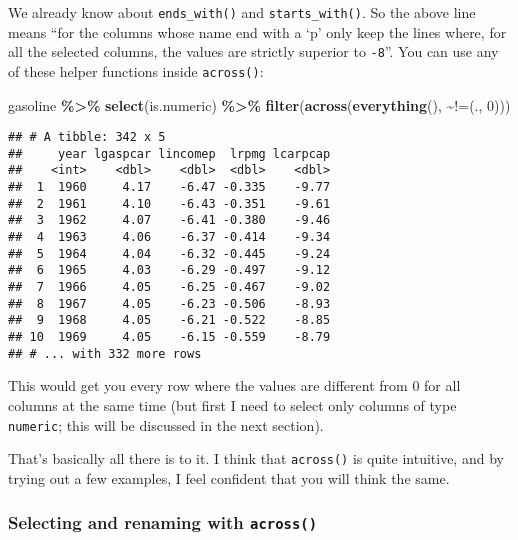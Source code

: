 \documentclass[
]{article}
\newenvironment{Shaded}{\begin{snugshade}}{\end{snugshade}}
\newcommand{\DataTypeTok}[1]{\textcolor[rgb]{0.13,0.29,0.53}{#1}}
\newcommand{\DecValTok}[1]{\textcolor[rgb]{0.00,0.00,0.81}{#1}}
\newcommand{\KeywordTok}[1]{\textcolor[rgb]{0.13,0.29,0.53}{\textbf{#1}}}
\newcommand{\NormalTok}[1]{#1}
\newcommand{\OperatorTok}[1]{\textcolor[rgb]{0.81,0.36,0.00}{\textbf{#1}}}
\newcommand{\StringTok}[1]{\textcolor[rgb]{0.31,0.60,0.02}{#1}}
\begin{document}
We already know about \texttt{ends\_with()} and \texttt{starts\_with()}. So the above line means ``for the columns
whose name end with a `p' only keep the lines where, for all the selected columns, the values are
strictly superior to \texttt{-8}''. You can use any of these helper functions inside \texttt{across()}:

\begin{Shaded}
\begin{Highlighting}[]
\NormalTok{gasoline }\OperatorTok{\%\textgreater{}\%}
\StringTok{  }\KeywordTok{select}\NormalTok{(is.numeric) }\OperatorTok{\%\textgreater{}\%}\StringTok{  }
\StringTok{  }\KeywordTok{filter}\NormalTok{(}\KeywordTok{across}\NormalTok{(}\KeywordTok{everything}\NormalTok{(), }\OperatorTok{\textasciitilde{}}\StringTok{\textasciigrave{}}\DataTypeTok{!=}\StringTok{\textasciigrave{}}\NormalTok{(., }\DecValTok{0}\NormalTok{)))}
\end{Highlighting}
\end{Shaded}

\begin{verbatim}
## # A tibble: 342 x 5
##     year lgaspcar lincomep  lrpmg lcarpcap
##    <int>    <dbl>    <dbl>  <dbl>    <dbl>
##  1  1960     4.17    -6.47 -0.335    -9.77
##  2  1961     4.10    -6.43 -0.351    -9.61
##  3  1962     4.07    -6.41 -0.380    -9.46
##  4  1963     4.06    -6.37 -0.414    -9.34
##  5  1964     4.04    -6.32 -0.445    -9.24
##  6  1965     4.03    -6.29 -0.497    -9.12
##  7  1966     4.05    -6.25 -0.467    -9.02
##  8  1967     4.05    -6.23 -0.506    -8.93
##  9  1968     4.05    -6.21 -0.522    -8.85
## 10  1969     4.05    -6.15 -0.559    -8.79
## # ... with 332 more rows
\end{verbatim}

This would get you every row where the values are different from 0 for all columns at the
same time (but first I need to select only columns of type \texttt{numeric}; this will be discussed
in the next section).

That's basically all there is to it. I think that \texttt{across()} is quite intuitive, and by trying out
a few examples, I feel confident that you will think the same.

\hypertarget{selecting-and-renaming-with-across}{%
\subsubsection{\texorpdfstring{Selecting and renaming with \texttt{across()}}{Selecting and renaming with across()}}\label{selecting-and-renaming-with-across}}
\end{document}
